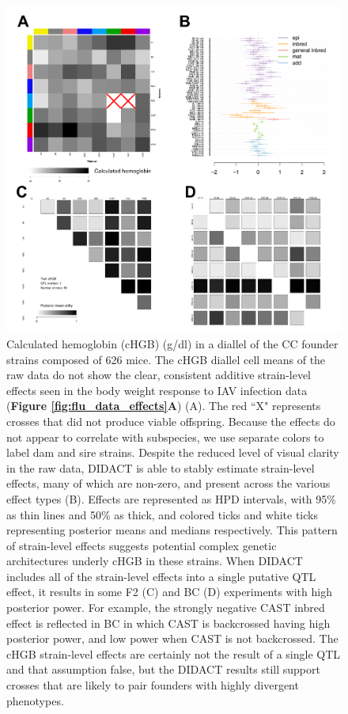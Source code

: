\begin{figure}
\renewcommand{\familydefault}{\sfdefault}\normalfont
\centering
\includegraphics[width=\textwidth]{figures/2-didact/chgb_panel.pdf}
\caption[DIDACT analysis of a complex trait, calculated hemoglobin]{Calculated hemoglobin (cHGB) (g/dl) in a diallel of the CC founder strains composed of 626 mice. The cHGB diallel cell means of the raw data do not show the clear, consistent additive strain-level effects seen in the body weight response to IAV infection data (\textbf{Figure \ref{fig:flu_data_effects}A}) (A). The red ``X" represents crosses that did not produce viable offspring. Because the effects do not appear to correlate with subspecies, we use separate colors to label dam and sire strains. Despite the reduced level of visual clarity in the raw data, DIDACT is able to stably estimate strain-level effects, many of which are non-zero, and present across the various effect types (B). Effects are represented as HPD intervals, with 95\% as thin lines and 50\% as thick, and colored ticks and white ticks representing posterior means and medians respectively. This pattern of strain-level effects suggests potential complex genetic architectures underly cHGB in these strains. When DIDACT includes all of the strain-level effects into a single putative QTL effect, it results in some F2 (C) and BC (D) experiments with high posterior power. For example, the strongly negative CAST inbred effect is reflected in BC in which CAST is backcrossed having high posterior power, and low power when CAST is not backcrossed. The cHGB strain-level effects are certainly not the result of a single QTL and that assumption false, but the DIDACT results still support crosses that are likely to pair founders with highly divergent phenotypes.\label{fig:chgb_figure}}
\end{figure}

